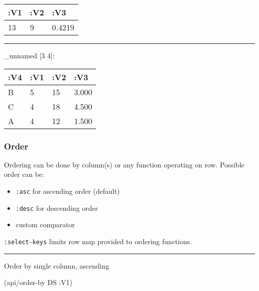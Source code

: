 \documentclass[]{article}
\newenvironment{Shaded}{\begin{snugshade}}{\end{snugshade}}
\newcommand{\KeywordTok}[1]{\textcolor[rgb]{0.13,0.29,0.53}{\textbf{#1}}}
\newcommand{\VariableTok}[1]{\textcolor[rgb]{0.00,0.00,0.00}{#1}}
\newcommand{\AttributeTok}[1]{\textcolor[rgb]{0.77,0.63,0.00}{#1}}
\newcommand{\NormalTok}[1]{#1}
\providecommand{\tightlist}{%
  \setlength{\itemsep}{0pt}\setlength{\parskip}{0pt}}
\begin{document}
\begin{longtable}[]{@{}lll@{}}
\toprule
:V1 & :V2 & :V3\tabularnewline
\midrule
\endhead
13 & 9 & 0.4219\tabularnewline
\bottomrule
\end{longtable}

\begin{center}\rule{0.5\linewidth}{0.5pt}\end{center}

\begin{Shaded}
\end{Shaded}

\_unnamed {[}3 4{]}:

\begin{longtable}[]{@{}llll@{}}
\toprule
:V4 & :V1 & :V2 & :V3\tabularnewline
\midrule
\endhead
B & 5 & 15 & 3.000\tabularnewline
C & 4 & 18 & 4.500\tabularnewline
A & 4 & 12 & 1.500\tabularnewline
\bottomrule
\end{longtable}

\subsubsection{Order}\label{order}

Ordering can be done by column(s) or any function operating on row.
Possible order can be:

\begin{itemize}
\tightlist
\item
  \texttt{:asc} for ascending order (default)
\item
  \texttt{:desc} for descending order
\item
  custom comparator
\end{itemize}

\texttt{:select-keys} limits row map provided to ordering functions.

\begin{center}\rule{0.5\linewidth}{0.5pt}\end{center}

Order by single column, ascending

\begin{Shaded}
\begin{Highlighting}[]
\NormalTok{(api/order-by DS }\AttributeTok{:V1}\NormalTok{)}
\end{Highlighting}
\end{Shaded}
\end{document}
